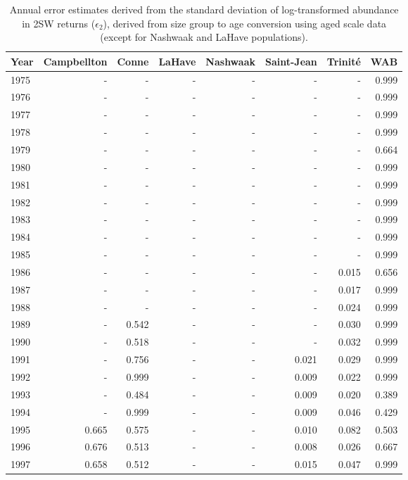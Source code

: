 \begingroup\footnotesize
\begin{longtable}{lrrrrrrr}
\caption{Annual error estimates derived from the standard deviation of log-transformed abundance 
                    in 2SW returns ($\epsilon_{2}$), derived from size group to age conversion using aged scale data 
                    (except for Nashwaak and LaHave populations).} \\ 
  \hline
Year & Campbellton & Conne & LaHave & Nashwaak & Saint-Jean & Trinité & WAB \\ 
  \hline
1975 & - & - & - & - & - & - & 0.999 \\ 
  1976 & - & - & - & - & - & - & 0.999 \\ 
  1977 & - & - & - & - & - & - & 0.999 \\ 
  1978 & - & - & - & - & - & - & 0.999 \\ 
  1979 & - & - & - & - & - & - & 0.664 \\ 
  1980 & - & - & - & - & - & - & 0.999 \\ 
  1981 & - & - & - & - & - & - & 0.999 \\ 
  1982 & - & - & - & - & - & - & 0.999 \\ 
  1983 & - & - & - & - & - & - & 0.999 \\ 
  1984 & - & - & - & - & - & - & 0.999 \\ 
  1985 & - & - & - & - & - & - & 0.999 \\ 
  1986 & - & - & - & - & - & 0.015 & 0.656 \\ 
  1987 & - & - & - & - & - & 0.017 & 0.999 \\ 
  1988 & - & - & - & - & - & 0.024 & 0.999 \\ 
  1989 & - & 0.542 & - & - & - & 0.030 & 0.999 \\ 
  1990 & - & 0.518 & - & - & - & 0.032 & 0.999 \\ 
  1991 & - & 0.756 & - & - & 0.021 & 0.029 & 0.999 \\ 
  1992 & - & 0.999 & - & - & 0.009 & 0.022 & 0.999 \\ 
  1993 & - & 0.484 & - & - & 0.009 & 0.020 & 0.389 \\ 
  1994 & - & 0.999 & - & - & 0.009 & 0.046 & 0.429 \\ 
  1995 & 0.665 & 0.575 & - & - & 0.010 & 0.082 & 0.503 \\ 
  1996 & 0.676 & 0.513 & - & - & 0.008 & 0.026 & 0.667 \\ 
  1997 & 0.658 & 0.512 & - & - & 0.015 & 0.047 & 0.999 \\ 

\end{longtable}
